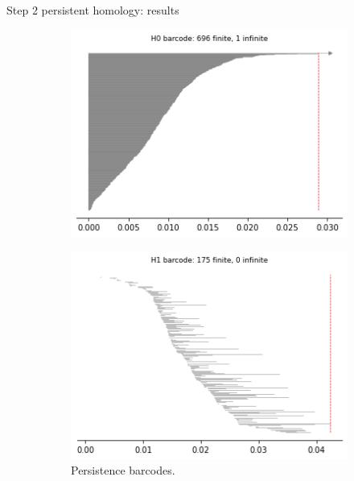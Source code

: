 \documentclass[xcolor={dvipsnames,svgnames}]{beamer}
\begin{document}
\begin{frame}{Step 2 persistent homology: results}
\begin{figure}[H]
\begin{subfigure}[b]{0.25\textwidth}
\end{subfigure}
\begin{subfigure}[b]{0.2\textwidth}
    \includegraphics[width=\textwidth]{figures/X3_H0_barcode.png}
    \caption{}
\end{subfigure}
\begin{subfigure}[b]{0.2\textwidth}
    \includegraphics[width=\textwidth]{figures/X3_H1_barcode.png}
        \caption{Persistence barcodes.}
\end{subfigure}
\begin{subfigure}[b]{0.2\textwidth}

\end{subfigure}
\end{figure}
\end{frame}
\end{document}
